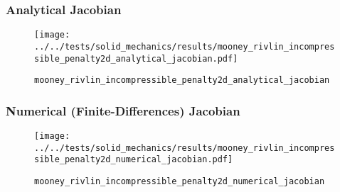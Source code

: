 
\begin{frame}
  \frametitle{Analytical Jacobian}
  \begin{figure}[h!]
    \centering    
    \texttt{[image: ../../tests/solid\_mechanics/results/mooney\_rivlin\_incompressible\_penalty2d\_analytical\_jacobian.pdf]}
    \caption{\lstinline{mooney_rivlin_incompressible_penalty2d_analytical_jacobian}}
  \end{figure} 
\end{frame}
%
%
\begin{frame}
  \frametitle{Numerical (Finite-Differences) Jacobian}
  \begin{figure}[h!]
    \centering    
    \texttt{[image: ../../tests/solid\_mechanics/results/mooney\_rivlin\_incompressible\_penalty2d\_numerical\_jacobian.pdf]}
    \caption{\lstinline{mooney_rivlin_incompressible_penalty2d_numerical_jacobian}}
  \end{figure}
\end{frame}
%
%
